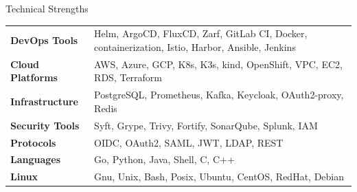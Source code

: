 \documentclass[
	a4paper, %
	10pt, %
]{resume} %
\begin{document}
\begin{rSection}{Technical Strengths}

	\begin{tabular}{@{} >{\bfseries}l @{\hspace{6ex}} l @{}}
		DevOps Tools & Helm, ArgoCD, FluxCD, Zarf, GitLab CI, Docker, containerization, Istio, Harbor, Ansible, Jenkins \\
		Cloud Platforms & AWS, Azure, GCP, K8s, K3s, kind, OpenShift, VPC, EC2, RDS, Terraform \\
		Infrastructure & PostgreSQL, Prometheus, Kafka, Keycloak, OAuth2-proxy, Redis \\
		Security Tools & Syft, Grype, Trivy, Fortify, SonarQube, Splunk, IAM \\
		Protocols & OIDC, OAuth2, SAML, JWT, LDAP, REST \\
		Languages & Go, Python, Java, Shell, C, C++ \\
		Linux & Gnu, Unix, Bash, Posix, Ubuntu, CentOS, RedHat, Debian \\
	\end{tabular}
\end{rSection}
\end{document}
